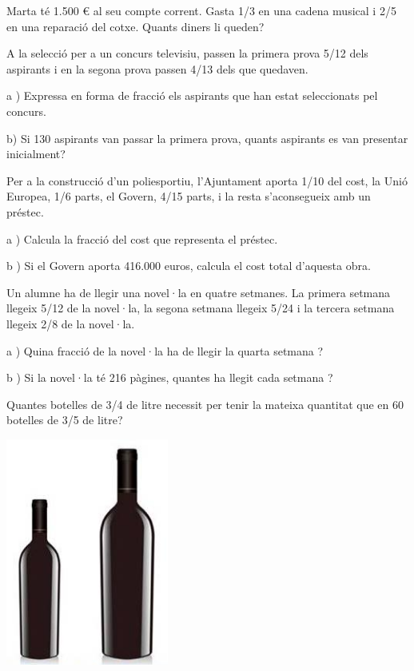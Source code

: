 \begin{mylist}
	
	\exer  Marta té 1.500 € al seu compte corrent. Gasta 1/3 en una cadena musical i 2/5 en una reparació del cotxe. Quants diners li queden?
\answers{100 \euro{}}




	\exer  A la selecció per a un concurs televisiu, passen la primera prova 5/12 dels aspirants i en la segona prova passen 4/13 dels que quedaven.


a ) Expressa en forma de fracció els aspirants que han estat seleccionats pel concurs.

b) Si 130 aspirants van passar la primera prova, quants aspirants es van presentar inicialment?



	\exer   Per a la construcció d'un poliesportiu, l'Ajuntament aporta 1/10 del cost, la Unió Europea, 1/6 parts, el Govern, 4/15 parts, i la resta s'aconsegueix amb un préstec.


a ) Calcula la fracció del cost que representa el préstec.

b ) Si el Govern aporta 416.000 euros, calcula el cost total d'aquesta obra.

\answers{[7/15, 1.560.000 \euro{}]}


	\exer  Un alumne ha de llegir una novel·la en quatre setmanes. La primera setmana llegeix 5/12 de la novel·la, la segona setmana llegeix 5/24 i la tercera setmana llegeix 2/8 de la novel·la.


a ) Quina fracció de la novel·la ha de llegir la quarta setmana ?

b ) Si la novel·la té 216 pàgines, quantes ha llegit cada setmana ?


	\exer  
	\begin{minipage}[t]{0.7\textwidth}	
	  Quantes botelles de 3/4 de litre necessit per tenir la mateixa quantitat que en 60 botelles de 3/5 de litre?
\end{minipage}
\begin{minipage}[t]{0.3\textwidth}
	\centering
	\vspace{-1.75cm}
	\includegraphics[width=0.4\textwidth,valign=t]{img-01/botellas}
\end{minipage}



\end{mylist}
